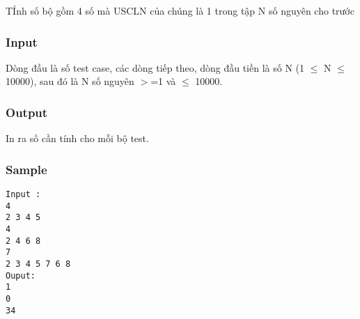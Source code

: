 



   TÍnh số bộ gồm 4 số mà USCLN của chúng là 1 trong tập N số nguyên cho trước  



\subsubsection{   Input  }



   Dòng đầu là số test case, các dòng tiếp theo, dòng đầu tiền là số N (1 $\le$ N  $\le$ 10000),  sau đó là N số nguyên $>$=1 và   $\le$  10000.  



\subsubsection{   Output  }



   In ra số cần tính cho mỗi bộ test.  



\subsubsection{   Sample  }
\begin{verbatim}
Input :
4  
2 3 4 5 
4 
2 4 6 8 
7 
2 3 4 5 7 6 8 
Ouput: 
1 
0 
34 
\end{verbatim}
